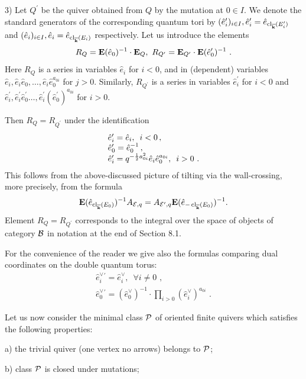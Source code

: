 \documentclass[12pt]{article}
\begin{document}
3) Let $Q^{\prime}$ be the quiver obtained from $Q$ by the mutation at $0\in I$. We denote the standard generators of the corresponding quantum tori by $(\hat{e}_i^{\prime})_{i\in I}, \hat{e}_i^{\prime}=\hat{e}_{\operatorname{cl}_{{\overline{\bf k}}}(E_i^{\prime})}$ and $(\hat{e}_i)_{i\in I},\hat{e}_i=\hat{e}_{\operatorname{cl}_{{\overline{\bf k}}}(E_i)}$ respectively. Let us introduce the elements
$$R_Q={\bf E}(\hat{e}_0)^{-1}\cdot{\bf E}_Q,\,\,R_{Q^{\prime}}={\bf E}_{Q^{\prime}}\cdot{\bf E}(\hat{e}_0^{\prime})^{-1}\,\,.$$ Here
$R_Q$ is a series in variables $\hat{e}_i$ for $ i<0$, and in (dependent) variables  $\hat{e}_i,\hat{e}_i\hat{e}_0,\dots,\hat{e}_i\hat{e}_0^{a_{0i}}$ for $ j>0$.
 Similarly, 
$R_{Q^{\prime}}$ is a series in variables $\hat{e}_i^{\prime}$ for $ i<0$ and
$\hat{e}_i^{\prime},\hat{e}_i^{\prime}\hat{e}_0^{\prime}\dots,\hat{e}_i^{\prime}(\hat{e}_0^{\prime})^{ a_{0i}}$ for $i>0$.

Then $R_Q=R_{Q^{\prime}}$ under the identification 
$$\begin{array}{l}
\hat{e}_i^{\prime}=\hat{e}_i, \,\,\,i<0\,,\\
\hat{e}_0^{\prime}=\hat{e}_0^{-1}\,,\,\,\\
\hat{e}_i^{\prime}=q^{-{1\over{2}}a_{0i}^2}\hat{e}_i\hat{e}_0^{a_{0i}}, \,\,\,i>0\,\,.
\end{array}$$ This follows from the above-discussed picture of tilting via the wall-crossing, more precisely, from the formula
$${\bf E}(\hat{e}_{\operatorname{cl}_{{\overline{\bf k}}}(E_0)})^{-1}A_{{\cal E},q}=A_{{\cal E}^{\prime},q}{\bf E}(\hat{e}_{-\operatorname{cl}_{{\overline{\bf k}}}(E_0)})^{-1}.$$
Element $R_Q=R_{Q^{\prime}}$ corresponds to the integral over the space of objects of category ${\cal B}$ in notation at the end of Section 8.1.

For the convenience of the reader we give also the formulas comparing
dual coordinates on the double quantum torus:
$$  \begin{array}{l}
{\hat{e}^\vee_i}{}^{\prime}=\hat{e}^\vee_i,\,\,\,\forall i\ne 0 \,\,,\\
{\hat{e}^\vee_0}{}^{\prime}=(\hat{e}^\vee_0)^{-1}\cdot \prod_{i>0}\left(\hat{e}^\vee_i\right)^{a_{0i}}\,\,.
\end{array}  $$

Let us now consider the minimal class ${\cal P}$ of oriented finite quivers which satisfies the following properties:

a) the trivial quiver (one vertex no arrows) belongs to ${\cal P}$;

b) class ${\cal P}$ is closed under mutations;
\end{document}
